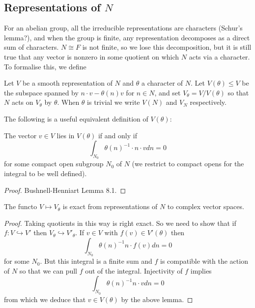 \subsection{Representations of $N$}

For an abelian group, all the irreducible representations are characters (Schur's lemma?), and when the group is finite, any representation decomposes as a direct sum of characters. $N \cong F$ is not finite, so we lose this decomposition, but it is still true that any vector is nonzero in some quotient on which $N$ acts via a character. To formalise this, we define

\begin{notn}
    Let $V$ be a smooth representation of $N$ and $\theta$ a character of $N$. Let $V(\theta) \leq V$ be the subspace spanned by $n\cdot v - \theta(n)v$ for $n\in N$, and set $V_\theta = V/V(\theta)$ so that $N$ acts on $V_\theta$ by $\theta$. When $\theta$ is trivial we write $V(N)$ and $V_N$ respectively. 
\end{notn}

The following is a useful equivalent definition of $V(\theta)$:

\begin{lemma}\label{criteria N}
    The vector $v \in V$ lies in $V(\theta)$ if and only if 
    $$\int_{N_0} \theta(n)^{-1} \cdot n \cdot v dn = 0$$
    for some compact open subgroup $N_0$ of $N$ (we restrict to compact opens for the integral to be well defined).
\end{lemma}
\begin{proof}
    Bushnell-Henniart Lemma 8.1.
\end{proof}

\begin{cor}
    The functo $V \mapsto V_\theta$ is exact from representations of $N$ to complex vector spaces.
\end{cor}
\begin{proof}
    Taking quotients in this way is right exact. So we need to show that if $f: V \hookrightarrow V'$ then $V_\theta \hookrightarrow V'_\theta$. If $v \in V$ with $f(v) \in V'(\theta)$ then 
    $$\int_{N_0} \theta(n)^{-1}n \cdot f(v) dn = 0$$
    for some $N_0$. But this integral is a finite sum and $f$ is compatible with the action of $N$ so that we can pull $f$ out of the integral. Injectivity of $f$ implies
    $$\int_{N_0} \theta(n)^{-1}n \cdot v dn = 0$$
    from which we deduce that $v \in V(\theta)$ by the above lemma.
\end{proof}

